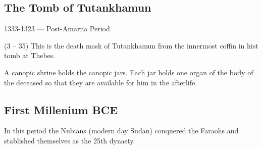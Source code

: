 \documentclass{article}
\begin{document}
\begin{spacing}{1.2}
    \subsection{The Tomb of Tutankhamun}
    \begin{flushright}
        1333-1323 --- Post-Amarna Period
    \end{flushright}

    (3 -- 35) This is the death mask of Tutankhamun from the innermost coffin in hist tomb at Thebes. 
    
    A canopic shrine holds the canopic jars. Each jar holds one organ of the body of the deceased so that they are available for him in the afterlife.

    \subsection{First Millenium BCE}
    In this period the Nubians (modern day Sudan) conquered the Faraohs and stablished themselves as the 25th dynasty.

\end{spacing}
    
\end{document}
